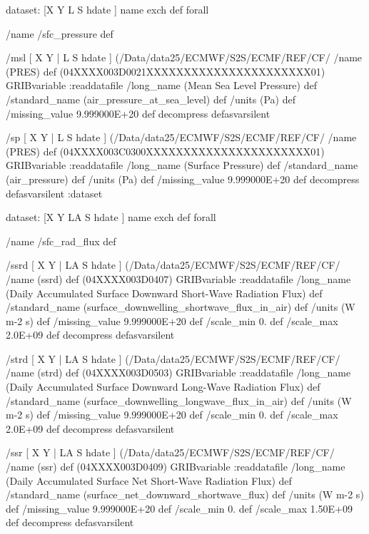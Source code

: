 \begin{ingrid}
{dataset:
[X Y L S hdate ] {name exch def } forall

/name /sfc_pressure def

/msl { [ X Y | L S hdate ] (/Data/data25/ECMWF/S2S/ECMF/REF/CF/%
/name (PRES) def
(04XXXX003D0021XXXXXXXXXXXXXXXXXXXXXX01) GRIBvariable
:readdatafile
/long_name (Mean Sea Level Pressure) def
/standard_name (air_pressure_at_sea_level) def
/units (Pa) def
/missing_value 9.999000E+20 def
decompress
} defasvarsilent

/sp { [ X Y | L S hdate ] (/Data/data25/ECMWF/S2S/ECMF/REF/CF/%
/name (PRES) def
(04XXXX003C0300XXXXXXXXXXXXXXXXXXXXXX01) GRIBvariable
:readdatafile
/long_name (Surface Pressure) def
/standard_name (air_pressure) def
/units (Pa) def
/missing_value 9.999000E+20 def
decompress
} defasvarsilent
:dataset

dataset:
[X Y LA S hdate ] {name exch def } forall

/name /sfc_rad_flux def

/ssrd { [ X Y | LA S hdate ] (/Data/data25/ECMWF/S2S/ECMF/REF/CF/%
/name (ssrd) def
(04XXXX003D0407) GRIBvariable
:readdatafile
/long_name (Daily Accumulated Surface Downward Short-Wave Radiation Flux) def
/standard_name (surface_downwelling_shortwave_flux_in_air) def
/units (W m-2 s) def
/missing_value 9.999000E+20 def
/scale_min 0. def
/scale_max 2.0E+09 def
decompress
} defasvarsilent

/strd { [ X Y | LA S hdate ] (/Data/data25/ECMWF/S2S/ECMF/REF/CF/%
/name (strd) def
(04XXXX003D0503) GRIBvariable
:readdatafile
/long_name (Daily Accumulated Surface Downward Long-Wave Radiation Flux) def
/standard_name (surface_downwelling_longwave_flux_in_air) def
/units (W m-2 s) def
/missing_value 9.999000E+20 def
/scale_min 0. def
/scale_max 2.0E+09 def
decompress
} defasvarsilent

/ssr { [ X Y | LA S hdate ] (/Data/data25/ECMWF/S2S/ECMF/REF/CF/%
/name (ssr) def
(04XXXX003D0409) GRIBvariable
:readdatafile
/long_name (Daily Accumulated Surface Net Short-Wave Radiation Flux) def
/standard_name (surface_net_downward_shortwave_flux) def
/units (W m-2 s) def
/missing_value 9.999000E+20 def
/scale_min 0. def
/scale_max 1.50E+09 def
decompress
} defasvarsilent

}
\end{ingrid}
